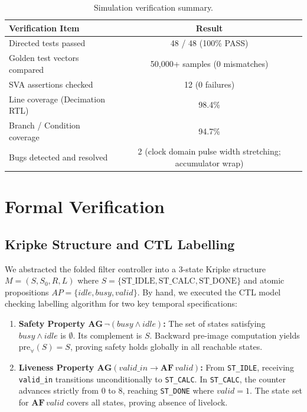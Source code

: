 \documentclass[11pt,a4paper]{article}
\begin{document}
\begin{table}[H]\centering\small
\caption{Simulation verification summary.}\label{tab:simsummary}
\begin{tabular}{@{}lc@{}}
\toprule
Verification Item & Result\\
\midrule
Directed tests passed & 48 / 48 (100\% PASS)\\
Golden test vectors compared & 50,000+ samples (0 mismatches)\\
SVA assertions checked & 12 (0 failures)\\
Line coverage (Decimation RTL) & 98.4\%\\
Branch / Condition coverage & 94.7\%\\
Bugs detected and resolved & 2 (clock domain pulse width stretching; accumulator wrap)\\
\bottomrule
\end{tabular}
\end{table}

\section{Formal Verification}
\label{sec:formal}

\subsection{Kripke Structure and CTL Labelling}
We abstracted the folded filter controller into a 3-state Kripke structure $M = (S, S_0, R, L)$ where $S = \{\text{ST\_IDLE}, \text{ST\_CALC}, \text{ST\_DONE}\}$ and atomic propositions $AP = \{\mathit{idle}, \mathit{busy}, \mathit{valid}\}$. By hand, we executed the CTL model checking labelling algorithm for two key temporal specifications:
\begin{enumerate}
  \item \textbf{Safety Property $\mathbf{AG}\,\neg(\mathit{busy} \land \mathit{idle})$:} The set of states satisfying $\mathit{busy} \land \mathit{idle}$ is $\emptyset$. Its complement is $S$. Backward pre-image computation yields $\text{pre}_{\forall}(S) = S$, proving safety holds globally in all reachable states.
  \item \textbf{Liveness Property $\mathbf{AG}(\mathit{valid\_in} \rightarrow \mathbf{AF}\,\mathit{valid})$:} From \texttt{ST\_IDLE}, receiving \texttt{valid\_in} transitions unconditionally to \texttt{ST\_CALC}. In \texttt{ST\_CALC}, the counter advances strictly from 0 to 8, reaching \texttt{ST\_DONE} where $\mathit{valid} = 1$. The state set for $\mathbf{AF}\,\mathit{valid}$ covers all states, proving absence of livelock.
\end{enumerate}
\end{document}
